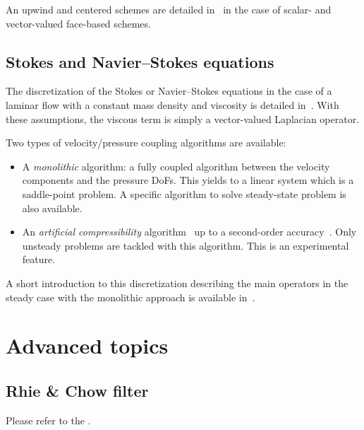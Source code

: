 An upwind and centered schemes are detailed in~\cite{Mila20} in the case of
scalar- and vector-valued face-based schemes.

\subsection{Stokes and Navier--Stokes equations}

The discretization of the Stokes or Navier--Stokes equations in the case of a
laminar flow with a constant mass density and viscosity is detailed
in~\cite{Mila20}. With these assumptions, the viscous term is simply a
vector-valued Laplacian operator.

Two types of velocity/pressure coupling algorithms are available:
\begin{itemize}
\item A \emph{monolithic} algorithm: a fully coupled algorithm between the
  velocity components and the pressure DoFs. This yields to a linear system
  which is a saddle-point problem. A specific algorithm to solve steady-state
  problem is also available.
\item An \emph{artificial compressibility} algorithm~\cite{GuMi15} up to a
  second-order accuracy~\cite{MiBoE22}. Only unsteady problems are tackled with this
  algorithm. This is an experimental feature.
\end{itemize}

A short introduction to this discretization describing the main operators in
the steady case with the monolithic approach is available in~\cite{BoErM20}.

\section{Advanced topics}

\subsection{Rhie \& Chow filter}

\hypertarget{arak}{}

Please refer to the .

